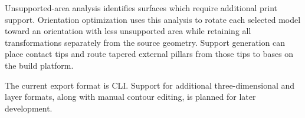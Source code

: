 Unsupported-area analysis identifies surfaces which require additional print
support. Orientation optimization uses this analysis to rotate each selected
model toward an orientation with less unsupported area while retaining all
transformations separately from the source geometry. Support generation can
place contact tips and route tapered external pillars from those tips to bases
on the build platform.

The current export format is CLI. Support for additional three-dimensional and
layer formats, along with manual contour editing, is planned for later
development.
